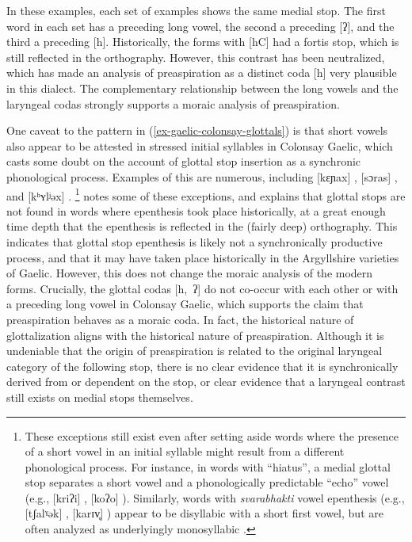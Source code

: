 \documentclass[output=paper,colorlinks,citecolor=brown]{langscibook}
\begin{document}
In these examples, each set of examples shows the same medial stop. The first word in each set has a preceding long vowel, the second a preceding [ʔ], and the third a preceding [h]. Historically, the forms with [hC] had a fortis stop, which is still reflected in the orthography. However, this contrast has been neutralized, which has made an analysis of preaspiration as a distinct coda [h] very plausible in this dialect. The complementary relationship between the long vowels and the laryngeal codas strongly supports a moraic analysis of preaspiration.

One caveat to the pattern in (\ref{ex-gaelic-colonsay-glottals}) is that short vowels also appear to be attested in stressed initial syllables in Colonsay Gaelic, which casts some doubt on the account of glottal stop insertion as a synchronic phonological process. Examples of this are numerous, including  [kɛɲax] ,  [sɔras] , and  [kʰʏlʲəx] .%
\footnote{These exceptions still exist even after setting aside words where the presence of a short vowel in an initial syllable might result from a different phonological process. For instance, in words with ``hiatus'', a medial glottal stop separates a short vowel and a phonologically predictable ``echo'' vowel (e.g.,  [kriʔi] ,  [koʔo] ). Similarly, words with \textit{svarabhakti} vowel epenthesis (e.g.,  [tʃalˠək] ,  [karɪv̥] ) appear to be disyllabic with a short first vowel, but are often analyzed as underlyingly monosyllabic \citep{scouller2017}.}
\citet{scouller2017} notes some of these exceptions, and explains that glottal stops are not found in words where epenthesis took place historically, at a great enough time depth that the epenthesis is reflected in the (fairly deep) orthography. This indicates that glottal stop epenthesis is likely not a synchronically productive process, and that it may have taken place historically in the Argyllshire varieties of Gaelic. However, this does not change the moraic analysis of the modern forms. 
Crucially, the glottal codas [h,~ʔ] do not co-occur with each other or with a preceding long vowel in Colonsay Gaelic, which supports the claim that preaspiration behaves as a moraic coda.
In fact, the historical nature of glottalization aligns with the historical nature of preaspiration. Although it is undeniable that the origin of preaspiration is related to the original laryngeal category of the following stop, there is no clear evidence that it is synchronically derived from or dependent on the stop, or clear evidence that a laryngeal contrast still exists on medial stops themselves.%
\end{document}
